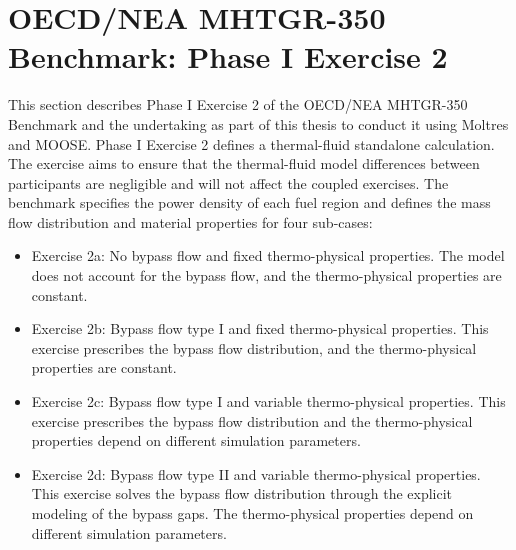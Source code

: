 

\section{OECD/NEA MHTGR-350 Benchmark: Phase I Exercise 2}
\label{sec:ph1ex2}

This section describes Phase I Exercise 2 of the OECD/NEA MHTGR-350 Benchmark \cite{oecd_nea_benchmark_2017} and the undertaking as part of this thesis to conduct it using Moltres and MOOSE.
Phase I Exercise 2 defines a thermal-fluid standalone calculation.
The exercise aims to ensure that the thermal-fluid model differences between participants are negligible and will not affect the coupled exercises.
The benchmark specifies the power density of each fuel region and defines the mass flow distribution and material properties for four sub-cases:
\begin{itemize}
  \item Exercise 2a: No bypass flow and fixed thermo-physical properties. The model does not account for the bypass flow, and the thermo-physical properties are constant.
  \item Exercise 2b: Bypass flow type I and fixed thermo-physical properties. This exercise prescribes the bypass flow distribution, and the thermo-physical properties are constant.
  \item Exercise 2c: Bypass flow type I and variable thermo-physical properties. This exercise prescribes the bypass flow distribution and the thermo-physical properties depend on different simulation parameters.
  \item Exercise 2d: Bypass flow type II and variable thermo-physical properties. This exercise solves the bypass flow distribution through the explicit modeling of the bypass gaps. The thermo-physical properties depend on different simulation parameters.
\end{itemize}

